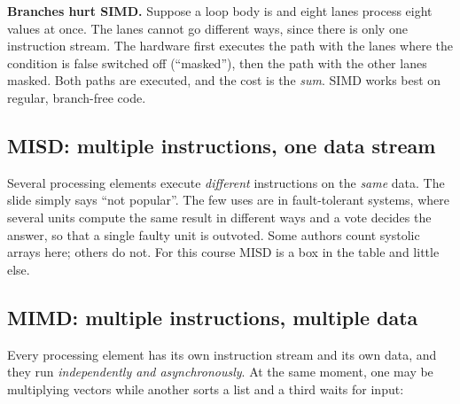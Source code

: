 \begin{pitfall}
\textbf{Branches hurt SIMD.} Suppose a loop body is 
and eight lanes process eight values at once. The lanes cannot go different ways, since there is only one instruction stream. The
hardware first executes the  path with the lanes where the condition is false switched off (``masked''), then the 
path with the other lanes masked. Both paths are executed, and the cost is the \emph{sum}. SIMD works best on regular,
branch-free code.
\end{pitfall}

\subsection{MISD: multiple instructions, one data stream}

Several processing elements execute \emph{different} instructions on the \emph{same} data. The slide
simply says ``not popular''. The few uses are in fault-tolerant systems, where several units compute the same
result in different ways and a vote decides the answer, so that a single faulty unit is outvoted. Some authors count
systolic arrays here; others do not. For this course MISD is a box in the table and little else.

\subsection{MIMD: multiple instructions, multiple data}

Every processing element has its own instruction stream and its own data, and they run
\emph{independently and asynchronously}. At the same moment, one may be multiplying vectors while another
sorts a list and a third waits for input:

\begin{center}
\end{center}

